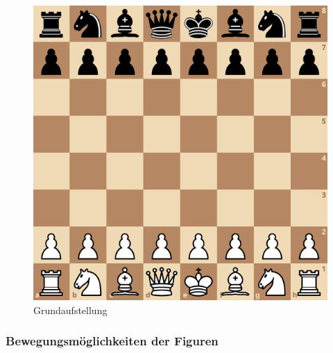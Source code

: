 \documentclass[12pt]{article}
\begin{document}
\begin{figure}
\centering
\includegraphics{../Abbildungen/Grundaufstellung.png}
\caption{Grundaufstellung}
\end{figure}

    \hypertarget{bewegungsmuxf6glichkeiten-der-figuren}{%
\subsubsection{Bewegungsmöglichkeiten der
Figuren}\label{bewegungsmuxf6glichkeiten-der-figuren}}
\end{document}
